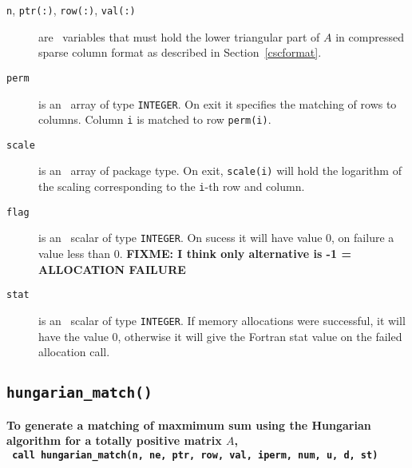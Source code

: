 \begin{description}

\item[\texttt{n}, \texttt{ptr(:)}, \texttt{row(:)}, \texttt{val(:)}] are \intentin\ variables that must hold the lower triangular part of $A$ in compressed sparse column format as described in Section~\ref{cscformat}.

\item[\texttt{perm}] is an \intentout\ array of type {\tt INTEGER}. On exit it
specifies the matching of rows to columns. Column \texttt{i} is matched to row
\texttt{perm(i)}.

\item[\texttt{scale}] is an \intentout\ array of package type. On exit,
\texttt{scale(i)} will hold the logarithm of the scaling corresponding to the
\texttt{i}-th row and column.

\item[\texttt{flag}] is an \intentout\ scalar of type {\tt INTEGER}. On sucess it will have value 0, on failure a value less than 0. \textbf{FIXME: I think only alternative is -1 = ALLOCATION FAILURE}

\item[\texttt{stat}] is an \intentout\ scalar of type {\tt INTEGER}. If memory allocations were successful, it will have the value 0, otherwise it will give the
Fortran stat value on the failed allocation call.

\end{description}

\subsection{\texttt{hungarian\_match()}}

\textbf{\noindent
   To generate a matching of maxmimum sum using the Hungarian algorithm for a totally positive matrix $A$,
   \vspace*{0.1cm} \\
   \texttt{ \hspace*{0.2cm}
      call hungarian\_match(n, ne, ptr, row, val, iperm, num, u, d, st)
   }
   \vspace{0.3cm}
}

